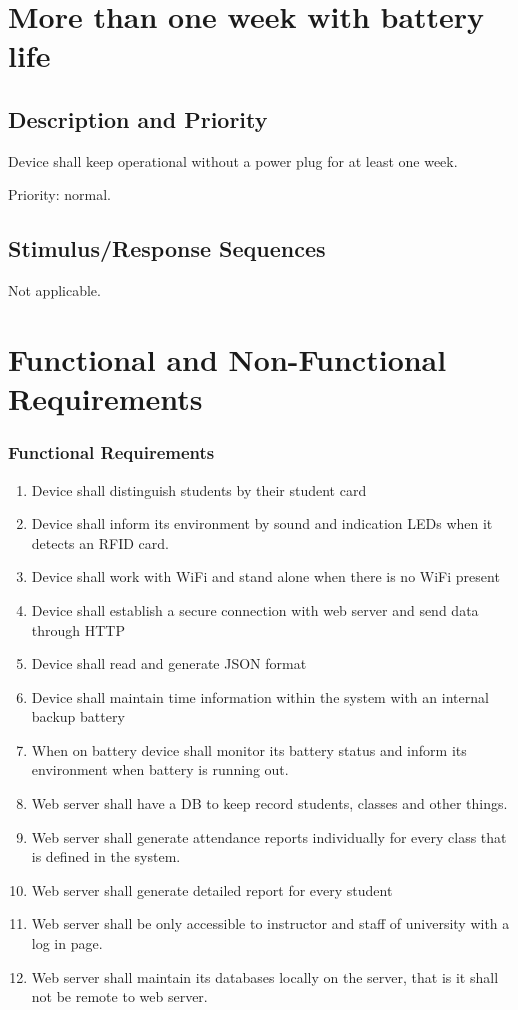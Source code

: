 \documentclass{scrreprt}
\begin{document}
\section{More than one week with battery life}
\subsection{Description and Priority}
Device shall keep operational without a power plug for at least one week.

Priority: normal.

\subsection{Stimulus/Response Sequences}

Not applicable.

\section{Functional and Non-Functional Requirements}

\subsubsection{Functional Requirements}
\begin{enumerate}[leftmargin=5\parindent, label=FR-\arabic*:]

\item  Device shall distinguish students by their student card 
\item  Device shall inform its environment by sound and indication LEDs when it detects an RFID card.
\item  Device shall work with WiFi and stand alone when there is no WiFi present
\item  Device shall establish a secure connection with web server and send data through HTTP
\item  Device shall read and generate JSON format
\item  Device shall maintain time information within the system with an internal backup battery
\item  When on battery device shall monitor its battery status and inform its environment when battery is running out.
\item Web server shall have a DB to keep record students, classes and other things.
\item  Web server shall generate attendance reports individually for every class that is defined in the system.
\item  Web server shall generate detailed report for every student 
\item  Web server shall be only accessible to instructor and staff of university with a log in page.
\item  Web server shall maintain its databases locally on the server, that is it shall not be remote to web server.


\end{enumerate}
\end{document}
